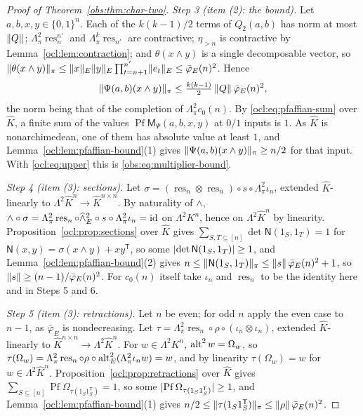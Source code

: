 \begin{proof}[Proof of Theorem~\ref{obs:thm:char-two}]
\emph{Step 3 (item (2): the bound).} Let $a,b,x,y\in\{0,1\}^n$. Each of the $k(k-1)/2$ terms of $Q_2(a,b)$ has norm at
most $\lVert Q\rVert$; $\Lambda^2_\pi\operatorname{res}^{n'}_n$ and $\Lambda^k_\pi\operatorname{res}_{n'}$ are contractive;
$\eta_{>n}$ is contractive by Lemma~\ref{ocl:lem:contraction}; and $\theta(x\wedge y)$ is a single decomposable vector,
so $\lVert \theta(x\wedge y)\rVert_\pi\le\lVert x\rVert_E\lVert y\rVert_E\prod_{t=n+1}^{n'}\lVert e_t\rVert_E\le\bar\varphi_E(n)^2$. Hence
\begin{equation}\label{ocl:eq:upper}
\lVert \Psi(a,b)(x\wedge y)\rVert_\pi\le\tfrac{k(k-1)}2\,\lVert Q\rVert\,\bar\varphi_E(n)^2 ,
\end{equation}
the norm being that of the completion of $\Lambda^2_\pi c_0(n)$. By \eqref{ocl:eq:pfaffian-sum} over $\widehat K$, a
finite sum of the values $\operatorname{Pf}\mathsf M_\Psi(a,b,x,y)$ at $0/1$ inputs is $1$. As $\widehat K$ is
nonarchimedean, one of them has absolute value at least $1$, and
Lemma~\ref{ocl:lem:pfaffian-bound}(1) gives $\lVert \Psi(a,b)(x\wedge y)\rVert_\pi\ge n/2$ for that input. With
\eqref{ocl:eq:upper} this is \eqref{obs:eq:multiplier-bound}.

\emph{Step 4 (item (3): sections).} Let $\sigma=(\operatorname{res}_n\otimes\operatorname{res}_n)\circ s\circ
\Lambda^2_\pi\iota_n$, extended $\widehat K$-linearly to $\Lambda^2\widehat K^n\to\widehat K^{n\times n}$. By naturality
of $\wedge$, $\wedge\circ\sigma=\Lambda^2_\pi\operatorname{res}_n\circ\widehat\wedge{}^2_E\circ s\circ
\Lambda^2_\pi\iota_n=\mathrm{id}$ on $\Lambda^2K^n$, hence on $\Lambda^2\widehat K^n$ by linearity.
Proposition~\ref{ocl:prop:sections} over $\widehat K$ gives $\sum_{S,T\subseteq[n]}\det\mathsf N(1_S,1_T)=1$ for
$\mathsf N(x,y)=\sigma(x\wedge y)+xy^{\mathsf T}$, so some $\lvert \det\mathsf N(1_S,1_T)\rvert\ge1$, and
Lemma~\ref{ocl:lem:pfaffian-bound}(2) gives $n\le\lVert \mathsf N(1_S,1_T)\rVert_\pi\le\lVert s\rVert\,\bar\varphi_E(n)^2+1$, so
$\lVert s\rVert\ge(n-1)/\bar\varphi_E(n)^2$. For $c_0(n)$ itself take $\iota_n$ and $\operatorname{res}_n$ to be the identity
here and in Steps 5 and 6.

\emph{Step 5 (item (3): retractions).} Let $n$ be even; for odd $n$ apply the even case to $n-1$, as $\bar\varphi_E$ is
nondecreasing. Let $\tau=\Lambda^2_\pi\operatorname{res}_n\circ\rho\circ(\iota_n\otimes\iota_n)$, extended
$\widehat K$-linearly to $\widehat K^{n\times n}\to\Lambda^2\widehat K^n$. For $w\in\Lambda^2K^n$,
$\operatorname{alt}^2w=\Omega_w$, so $\tau(\Omega_w)=\Lambda^2_\pi\operatorname{res}_n\circ\rho\circ
\operatorname{alt}^2_E(\Lambda^2_\pi\iota_nw)=w$, and by linearity $\tau(\Omega_w)=w$ for $w\in\Lambda^2\widehat K^n$.
Proposition~\ref{ocl:prop:retractions} over $\widehat K$ gives
$\sum_{S\subseteq[n]}\operatorname{Pf}\Omega_{\tau(1_S1_S^{\mathsf T})}=1$, so some
$\lvert \operatorname{Pf}\Omega_{\tau(1_S1_S^{\mathsf T})}\rvert\ge1$, and Lemma~\ref{ocl:lem:pfaffian-bound}(1) gives
$n/2\le\lVert \tau(1_S1_S^{\mathsf T})\rVert_\pi\le\lVert \rho\rVert\,\bar\varphi_E(n)^2$.


\end{proof}
